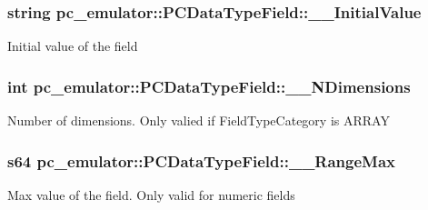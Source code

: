 \subsubsection[{\texorpdfstring{\+\_\+\+\_\+\+Initial\+Value}{__InitialValue}}]{\setlength{\rightskip}{0pt plus 5cm}string pc\+\_\+emulator\+::\+P\+C\+Data\+Type\+Field\+::\+\_\+\+\_\+\+Initial\+Value}\hypertarget{classpc__emulator_1_1PCDataTypeField_aed29902b81555d1af0ff3cd31e406cce}{}\label{classpc__emulator_1_1PCDataTypeField_aed29902b81555d1af0ff3cd31e406cce}
Initial value of the field 
\subsubsection[{\texorpdfstring{\+\_\+\+\_\+\+N\+Dimensions}{__NDimensions}}]{\setlength{\rightskip}{0pt plus 5cm}int pc\+\_\+emulator\+::\+P\+C\+Data\+Type\+Field\+::\+\_\+\+\_\+\+N\+Dimensions}\hypertarget{classpc__emulator_1_1PCDataTypeField_aaa0cf080c4e649f740e03f2916725c15}{}\label{classpc__emulator_1_1PCDataTypeField_aaa0cf080c4e649f740e03f2916725c15}
Number of dimensions. Only valied if Field\+Type\+Category is A\+R\+R\+AY 
\subsubsection[{\texorpdfstring{\+\_\+\+\_\+\+Range\+Max}{__RangeMax}}]{\setlength{\rightskip}{0pt plus 5cm}s64 pc\+\_\+emulator\+::\+P\+C\+Data\+Type\+Field\+::\+\_\+\+\_\+\+Range\+Max}\hypertarget{classpc__emulator_1_1PCDataTypeField_a05e85a316b84c14f57fe59167e9a1685}{}\label{classpc__emulator_1_1PCDataTypeField_a05e85a316b84c14f57fe59167e9a1685}
Max value of the field. Only valid for numeric fields 
